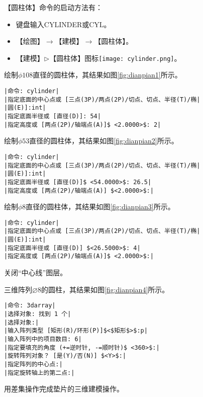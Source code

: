 \begin{procedure}
【圆柱体】命令的启动方法有：
\begin{itemize}
\item 键盘输入CYLINDER或CYL。
\item 【绘图】$\rightarrow$【建模】$\rightarrow$【圆柱体】。
\item 【建模】$\triangleright$【圆柱体】图标\texttt{[image: cylinder.png]}。
\end{itemize}
绘制$\phi 108$直径的圆柱体，其结果如图\ref{fig:dianpian1}所示。
\begin{lstlisting}
|命令: cylinder|
|指定底面的中心点或 [三点(3P)/两点(2P)/切点、切点、半径(T)/椭|
|圆(E)]:int|
|指定底面半径或 [直径(D)]: 54|
|指定高度或 [两点(2P)/轴端点(A)]$ <2.0000>$: 2|
\end{lstlisting}
绘制$\phi 53$直径的圆柱体，其结果如图\ref{fig:dianpian2}所示。
\begin{lstlisting}
|命令: cylinder|
|指定底面的中心点或 [三点(3P)/两点(2P)/切点、切点、半径(T)/椭|
|圆(E)]:int|
|指定底面半径或 [直径(D)]$ <54.0000>$: 26.5|
|指定高度或 [两点(2P)/轴端点(A)] $<2.0000>$:|
\end{lstlisting}
绘制$\phi 8$直径的圆柱体，其结果如图\ref{fig:dianpian3}所示。
\begin{lstlisting}
|命令: cylinder|
|指定底面的中心点或 [三点(3P)/两点(2P)/切点、切点、半径(T)/椭|
|圆(E)]:int|
|指定底面半径或 [直径(D)] $<26.5000>$: 4|
|指定高度或 [两点(2P)/轴端点(A)]$ <2.0000>$:|
\end{lstlisting}
\begin{figure}[htbp]
\centering
\begin{floatrow}
\hspace{30pt}
\end{floatrow}
\end{figure}
\item 关闭“中心线”图层。
\item 三维阵列$\diameter 8$的圆柱，其结果如图\ref{fig:dianpian4}所示。
\newpage
\begin{lstlisting}
|命令: 3darray|
|选择对象: 找到 1 个|
|选择对象:|
|输入阵列类型 [矩形(R)/环形(P)]$<$矩形$>$:p|
|输入阵列中的项目数目: 6|
|指定要填充的角度 (+=逆时针, -=顺时针)$ <360>$:|
|旋转阵列对象？ [是(Y)/否(N)] $<Y>$:|
|指定阵列的中心点:|
|指定旋转轴上的第二点:|
\end{lstlisting}
\item 用差集操作完成垫片的三维建模操作。

\end{procedure}
